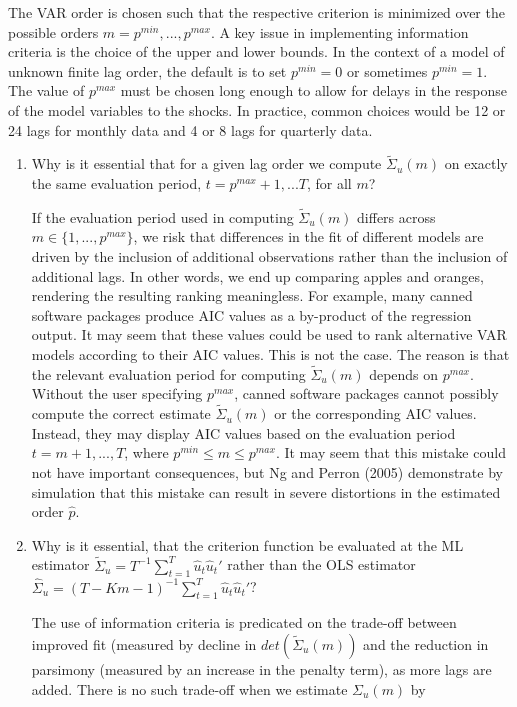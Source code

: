 The VAR order is chosen such that the respective criterion is minimized over the possible orders $m = p^{min},...,p^{max}$. A key issue in implementing information criteria is the choice of the upper and lower bounds. In the context of a model of unknown finite lag order, the default is to set $p^{min}=0$ or sometimes $p^{min} = 1$. The value of $p^{max}$ must be chosen long enough to allow for delays in the response of the model variables to the shocks. In practice, common choices would be 12 or 24 lags for monthly data and 4 or 8 lags for quarterly data.
\begin{enumerate}
    \item Why is it essential that for a given lag order we compute $\tilde{\Sigma}_u(m)$ on exactly the same evaluation period, $t=p^{max}+1,...T$, for all $m$?
          \begin{solution}
              If the evaluation period used in computing $\tilde{\Sigma}_u(m)$ differs across $m \in \{1,...,p^{max}\}$, we risk that differences in the fit of different models are driven by the inclusion of additional observations rather than the inclusion of additional lags. In other words, we end up comparing apples and oranges, rendering the resulting ranking meaningless. For example, many canned software packages produce AIC values as a by-product of the regression output. It may seem that these values could be used to rank alternative VAR models according to their AIC values. This is not the case. The reason is that the relevant evaluation period for computing $\tilde{\Sigma}_u(m)$ depends on $p^{max}$. Without the user specifying $p^{max}$, canned software packages cannot possibly compute the correct estimate $\tilde{\Sigma}_u(m)$ or the corresponding AIC values. Instead, they may display AIC values based on the evaluation period $t = m + 1,..., T$, where $p^{min} \leq m \leq p^{max}$. It may seem that this mistake could not have important consequences, but Ng and Perron (2005) demonstrate by simulation that this mistake can result in severe distortions in the estimated order $\hat{p}$.
          \end{solution}
    \item Why is it essential, that the criterion function be evaluated at the ML estimator $\tilde{\Sigma}_u=T^{-1}\sum_{t=1}^T \hat{u}_t\hat{u}_t'$ rather than the OLS estimator $\hat{\Sigma}_u=(T-Km-1)^{-1}\sum_{t=1}^T \hat{u}_t\hat{u}_t'$?
          \begin{solution}
              The use of information criteria is predicated on the trade-off between improved fit (measured by decline in $det(\tilde{\Sigma}_u(m))$ and the reduction in parsimony (measured by an increase in the penalty term), as more lags are added. There is no such trade-off when we estimate $\Sigma_u(m)$ by

\end{solution}
\end{enumerate}
